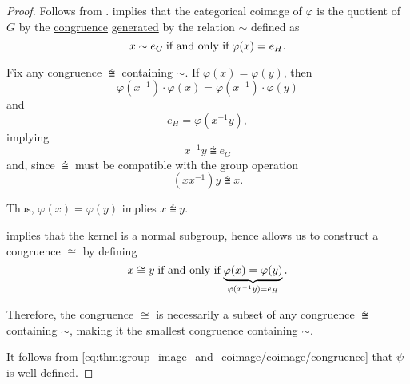 \begin{proof}
   Follows from .
    implies that the categorical coimage of \( \varphi \) is the quotient of \( G \) by the \hyperref[def:first_order_congruence]{congruence} \hyperref[def:first_order_generated_congruence]{generated} by the relation \( {\sim} \) defined as
  \begin{equation*}
    x \sim e_G \T{if and only if} \varphi(x) = e_H.
  \end{equation*}

  Fix any congruence \( {\congdot} \) containing \( {\sim} \). If \( \varphi(x) = \varphi(y) \), then
  \begin{equation*}
    \varphi(x^{-1}) \cdot \varphi(x) = \varphi(x^{-1}) \cdot \varphi(y)
  \end{equation*}
  and
  \begin{equation*}
    e_H = \varphi(x^{-1} y),
  \end{equation*}
  implying
  \begin{equation*}
    x^{-1} y \congdot e_G
  \end{equation*}
  and, since \( {\congdot} \) must be compatible with the group operation
  \begin{equation*}
    (x x^{-1}) y \congdot x.
  \end{equation*}

  Thus, \( \varphi(x) = \varphi(y) \) implies \( x \congdot y \).

   implies that the kernel is a normal subgroup, hence  allows us to construct a congruence \( {\cong} \) by defining
  \begin{equation}\label{eq:thm:group_image_and_coimage/coimage/congruence}
    x \cong y \T{if and only if} \underbrace{\varphi(x) = \varphi(y)}_{\varphi(x^{-1} y) = e_H}.
  \end{equation}

  Therefore, the congruence \( {\cong} \) is necessarily a subset of any congruence \( {\congdot} \) containing \( {\sim} \), making it the smallest congruence containing \( {\sim} \).

   It follows from \eqref{eq:thm:group_image_and_coimage/coimage/congruence} that \( \psi \) is well-defined.


\end{proof}
